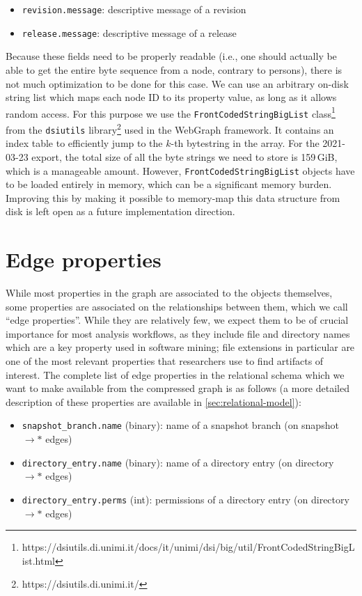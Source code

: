\begin{itemize}
    \setlength\itemsep{0em}
    \item \texttt{revision.message}: descriptive message of a revision
    \item \texttt{release.message}: descriptive message of a release
\end{itemize}

Because these fields need to be properly readable (i.e., one should actually be
able to get the entire byte sequence from a node, contrary to persons), there
is not much optimization to be done for this case. We can use an arbitrary
on-disk string list which maps each node ID to its property value, as long as
it allows random access. For this purpose we use the
\texttt{FrontCodedStringBigList}
class\footnote{https://dsiutils.di.unimi.it/docs/it/unimi/dsi/big/util/FrontCodedStringBigList.html}
from the \texttt{dsiutils} library\footnote{https://dsiutils.di.unimi.it/} used
in the WebGraph framework. It contains an index table to efficiently jump to
the $k$-th bytestring in the array.
For the 2021-03-23 export, the total size of all the byte strings we need to
store is 159\,GiB, which is a manageable amount.  However,
\texttt{FrontCodedStringBigList} objects have to be loaded entirely in memory,
which can be a significant memory burden. Improving this by making it possible
to memory-map this data structure from disk is left open as a future
implementation direction.

\section{Edge properties}%
\label{sec:mapping-edge-labels}

While most properties in the graph are associated to the objects themselves,
some properties are associated on the relationships between them, which we call
``edge properties''. While they are relatively few, we expect them to be of
crucial importance for most analysis workflows, as they include file and
directory names which are a key property used in software mining; file
extensions in particular are one of the most relevant properties that
researchers use to find artifacts of interest. The complete list of edge
properties in the relational schema which we want to make available from the
compressed graph is as follows (a more detailed description of these properties
are available in \cref{sec:relational-model}):

\begin{itemize}
    \setlength\itemsep{0em}
\item \texttt{snapshot\_branch.name} (binary): name of a snapshot branch
    (on snapshot $\to\ast$ edges)
\item \texttt{directory\_entry.name} (binary): name of a directory entry
    (on directory $\to\ast$ edges)
\item \texttt{directory\_entry.perms} (int): permissions of a directory
    entry (on directory $\to\ast$ edges)
\end{itemize}

